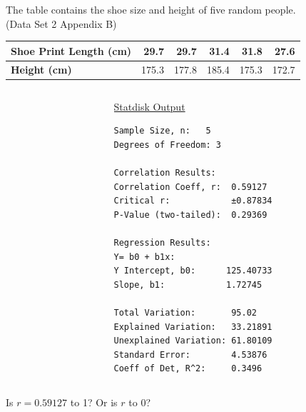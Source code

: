 \documentclass{beamer}
\begin{document}
\begin{frame}[fragile]
\begin{example}\label{shoe_example}
The table contains the shoe size and height of five random people.\\ (Data Set 2 Appendix B)
\begin{center}
\begin{tabular}{l|r|r|r|r|r}
\textbf{Shoe Print Length (cm)} & 29.7 & 29.7 & 31.4 & 31.8 & 27.6 \\\hline
\textbf{Height (cm)} & 175.3 & 177.8 & 185.4 & 175.3 & 172.7
\end{tabular}
\end{center}

\begin{columns}
\begin{column}{0.65\textwidth}
\end{column}
\begin{column}{0.3\textwidth}
{\tiny\underline{Statdisk Output}
\vspace{-2mm}
\begin{verbatim}
Sample Size, n:   5
Degrees of Freedom: 3

Correlation Results:
Correlation Coeff, r:  0.59127
Critical r:            ±0.87834
P-Value (two-tailed):  0.29369

Regression Results:
Y= b0 + b1x:
Y Intercept, b0:      125.40733
Slope, b1:            1.72745

Total Variation:       95.02
Explained Variation:   33.21891
Unexplained Variation: 61.80109
Standard Error:        4.53876
Coeff of Det, R^2:     0.3496
\end{verbatim}
}
\end{column}
\end{columns}
Is $r=0.59127$  to 1? Or is $r$  to 0?
\end{example}
\end{frame}
\end{document}
